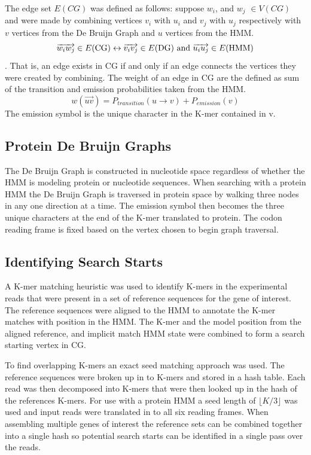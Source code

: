 \documentclass[10pt]{bmc_article}
\newenvironment{bmcformat}{\begin{raggedright}\baselineskip20pt\sloppy\setboolean{publ}{false}}{\end{raggedright}\baselineskip20pt\sloppy}
\begin{document}
\begin{bmcformat}
The edge set $E(CG)$ was defined as follows: suppose $w_i$, and $w_j$ \(\in V(CG) \) and were made by combining vertices $v_i$ with $u_i$ and $v_j$ with $u_j$ respectively with $v$ vertices from the De Bruijn Graph and $u$ vertices from the HMM.
\[\overrightarrow{w_iw_j} \in E(\textnormal{CG}) \leftrightarrow \overrightarrow{v_iv_j} \in 
E(\textnormal{DG})\textnormal{ and } \overrightarrow{u_iu_j} \in E(\textnormal{HMM})\].
That is, an edge exists in CG if and only if an edge connects the vertices they were created by combining.
The weight of an edge  in CG are the defined as sum of the transition and emission probabilities taken from the HMM.  
\[ w(\overrightarrow{uv}) = P_{transition}(u \rightarrow v) + P_{emission}(v) \]
The emission symbol is the unique character in the K-mer contained in v.

\subsection*{Protein De Bruijn Graphs}
The De Bruijn Graph is constructed in nucleotide space regardless of whether the HMM is modeling protein or nucleotide sequences.  When searching with a protein HMM the De Bruijn Graph is traversed in protein space by walking three nodes in any one direction at a time.  The emission symbol then becomes the three unique characters at the end of the K-mer translated to protein.  The codon reading frame is fixed based on the vertex chosen to begin graph traversal.

\subsection*{Identifying Search Starts}
A K-mer matching heuristic was used to identify K-mers in the experimental reads that were present in a set of reference sequences for the gene of interest.  The reference sequences were aligned to the HMM to annotate the K-mer matches with position in the HMM.  The K-mer and the model position from the aligned reference, and implicit match HMM state were combined to form a search starting vertex in CG.

To find overlapping K-mers an exact seed matching approach was used. The reference sequences were broken up in to K-mers and stored in a hash table. Each read was then decomposed into K-mers that were then looked up in the hash of the references K-mers.  For use with a protein HMM a seed length of $\lfloor K/3\rfloor$ was used and input reads were translated in to all six reading frames. When assembling multiple genes of interest the reference sets can be combined together into a single hash so potential search starts can be identified in a single pass over the reads.


\end{bmcformat}
\end{document}
